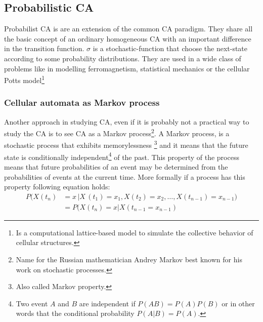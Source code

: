 \subsection{Probabilistic CA}
Probabilist CA is are an extension of the common CA paradigm. They share all
the basic concept of an ordinary homogeneous
CA with an important difference in the transition function.
\begin{math}\sigma\end{math} is a stochastic-function that choose the next-state
according to some probability distributions. They are used in a wide class of
problems like in modelling ferromagnetism, statistical mechanics
\cite{Vichniac1984} or the cellular Potts model\footnote{Is a computational
lattice-based model to simulate the collective behavior of cellular structures.}


\subsubsection{Cellular automata as Markov process}
Another approach in studying CA, even if it is probably not a practical
way to study the CA is to see CA as a Markov process\footnote{Name for the
Russian mathematician Andrey Markov best known for his work on stochastic
processes.}. A Markov process, is a stochastic process that exhibits
memorylessness \footnote{Also called Markov property.} and it means that the
future state is conditionally independent\footnote{Two event
\begin{math}A\end{math} and \begin{math}B\end{math} are independent if
\begin{math}P(A B)=P(A)P(B)\end{math} or in other words that the conditional
probability \begin{math}P(A|B)=P(A)\end{math}.} of the past.
This property of the process means that future probabilities of an event may be
determined from the probabilities of events at the current time.
More formally if a process has this property following  equation holds:
\begin{align*}
P(X(t_n)&= x \,| X\,(t_1) = x_1,X(t_2) = x_2, \ldots,X(t_{n-1})=x_{n-1}) \\
&= P(X(t_n)=x | X(t_{n-1}=x_{n-1})
\end{align*}

